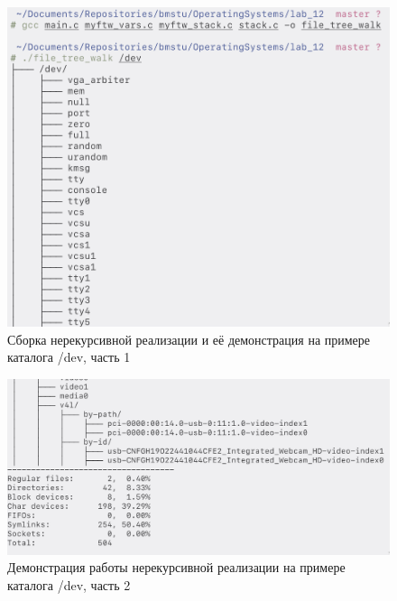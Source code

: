 \begin{figure}[H]
    \centering
    \caption{Сборка нерекурсивной реализации и её демонстрация на примере каталога /dev, часть 1}
    \includegraphics[scale=0.45]{images/scr_05.png}
\end{figure}
\begin{figure}[H]
    \centering
    \caption{Демонстрация работы нерекурсивной реализации на примере каталога /dev, часть 2}
    \includegraphics[scale=0.375]{images/scr_06.png}
\end{figure}

